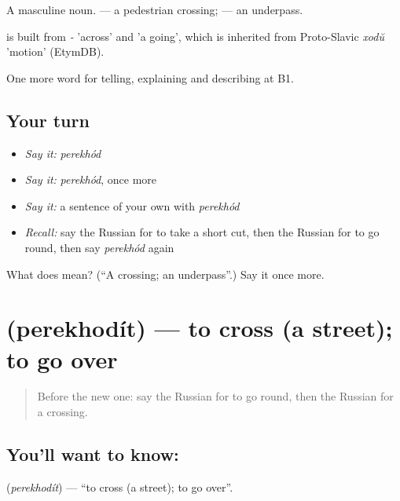 A masculine noun. \emph{ } — a pedestrian crossing; \emph{ } — an underpass.

\begin{cousinweb}
\emph{} is built from \emph{-} 'across' and \emph{} 'a going', which is inherited from Proto-Slavic \emph{xodŭ} 'motion' (EtymDB).
\end{cousinweb}

\begin{grammarlens}[title={What you've built}]
One more word for telling, explaining and describing at B1.
\end{grammarlens}

\subsection*{Your turn}
\begin{itemize}
\raggedright
  \item \emph{Say it:} \emph{perekhód}
  \item \emph{Say it:} \emph{perekhód}, once more
  \item \emph{Say it:} a sentence of your own with \emph{perekhód}
  \item \emph{Recall:} say the Russian for to take a short cut, then the Russian for to go round, then say \emph{perekhód} again
\end{itemize}

\begin{tcolorbox}[breakable,colback=teal!4,colframe=teal!35!black,title={Before you move on}]
What does  mean? (\textquotedblleft{}A crossing; an underpass\textquotedblright{}.) Say it once more.
\end{tcolorbox}
\section[\texorpdfstring{\ru{переходить} (perekhodít)}{переходить (perekhodít)}]{ (perekhodít) — to cross (a street); to go over}

\label{lesson:RU-C440-perekhodit}



\begin{quote}
Before the new one: say the Russian for to go round, then the Russian for a crossing.
\end{quote}

\subsection*{You'll want to know: }
\textbf{} (\emph{perekhodít}) — \textquotedblleft{}to cross (a street); to go over\textquotedblright{}.

